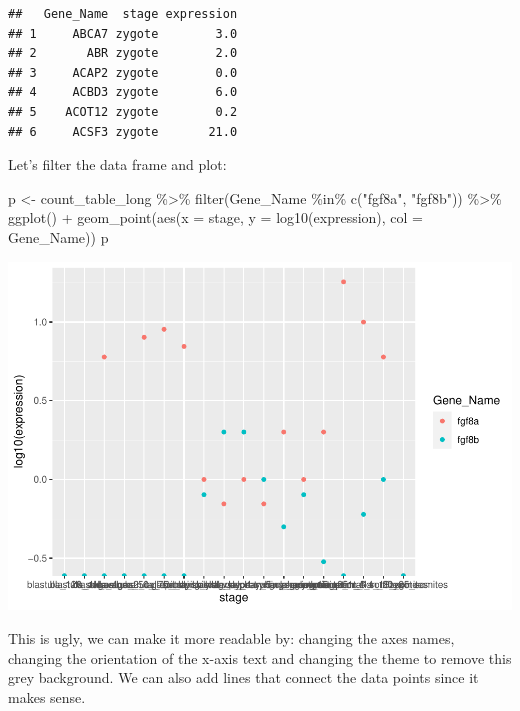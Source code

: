 \documentclass[
]{article}
\newenvironment{Shaded}{\begin{snugshade}}{\end{snugshade}}
\newcommand{\AttributeTok}[1]{\textcolor[rgb]{0.77,0.63,0.00}{#1}}
\newcommand{\FunctionTok}[1]{\textcolor[rgb]{0.00,0.00,0.00}{#1}}
\newcommand{\NormalTok}[1]{#1}
\newcommand{\OtherTok}[1]{\textcolor[rgb]{0.56,0.35,0.01}{#1}}
\newcommand{\SpecialCharTok}[1]{\textcolor[rgb]{0.00,0.00,0.00}{#1}}
\newcommand{\StringTok}[1]{\textcolor[rgb]{0.31,0.60,0.02}{#1}}
\begin{document}
\begin{verbatim}
##   Gene_Name  stage expression
## 1     ABCA7 zygote        3.0
## 2       ABR zygote        2.0
## 3     ACAP2 zygote        0.0
## 4     ACBD3 zygote        6.0
## 5    ACOT12 zygote        0.2
## 6     ACSF3 zygote       21.0
\end{verbatim}

Let's filter the data frame and plot:

\begin{Shaded}
\begin{Highlighting}[]
\NormalTok{p }\OtherTok{\textless{}{-}}\NormalTok{ count\_table\_long }\SpecialCharTok{\%\textgreater{}\%} 
  \FunctionTok{filter}\NormalTok{(Gene\_Name }\SpecialCharTok{\%in\%} \FunctionTok{c}\NormalTok{(}\StringTok{"fgf8a"}\NormalTok{, }\StringTok{"fgf8b"}\NormalTok{)) }\SpecialCharTok{\%\textgreater{}\%} 
  \FunctionTok{ggplot}\NormalTok{() }\SpecialCharTok{+}
  \FunctionTok{geom\_point}\NormalTok{(}\FunctionTok{aes}\NormalTok{(}\AttributeTok{x =}\NormalTok{ stage, }\AttributeTok{y =} \FunctionTok{log10}\NormalTok{(expression), }\AttributeTok{col =}\NormalTok{ Gene\_Name))}
\NormalTok{p}
\end{Highlighting}
\end{Shaded}

\includegraphics{1_R_basics_and_tidyverse_files/figure-latex/unnamed-chunk-20-1.pdf}

This is ugly, we can make it more readable by: changing the axes names,
changing the orientation of the x-axis text and changing the theme to
remove this grey background. We can also add lines that connect the data
points since it makes sense.
\end{document}
